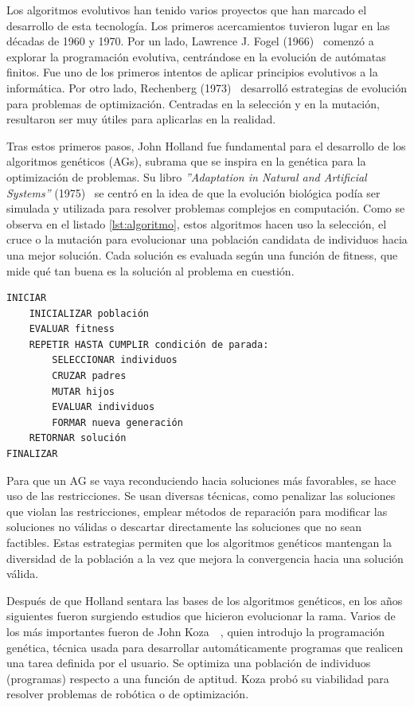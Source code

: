 Los algoritmos evolutivos han tenido varios proyectos que han marcado el desarrollo de esta tecnología. Los primeros acercamientos tuvieron lugar en las décadas de 1960 y 1970. Por un lado, Lawrence J. Fogel (1966)~\cite{fogel1966} comenzó a explorar la programación evolutiva, centrándose en la evolución de autómatas finitos. Fue uno de los primeros intentos de aplicar principios evolutivos a la informática. Por otro lado, Rechenberg (1973)~\cite{rechenberg1973} desarrolló estrategias de evolución para problemas de optimización. Centradas en la selección y en la mutación, resultaron ser muy útiles para aplicarlas en la realidad.

Tras estos primeros pasos, John Holland fue fundamental para el desarrollo de los algoritmos genéticos (AGs), subrama que se inspira en la genética para la optimización de problemas. Su libro \textit{''Adaptation in Natural and Artificial Systems''} (1975)~\cite{holland1975} se centró en la idea de que la evolución biológica podía ser simulada y utilizada para resolver problemas complejos en computación. Como se observa en el listado \ref{lst:algoritmo}, estos algoritmos hacen uso la selección, el cruce o la mutación para evolucionar una población candidata de individuos hacia una mejor solución. Cada solución es evaluada según una función de fitness, que mide qué tan buena es la solución al problema en cuestión.
\newpage
\begin{lstlisting}[caption=Algoritmo evolutivo., label={lst:algoritmo}]
INICIAR
    INICIALIZAR población
    EVALUAR fitness
    REPETIR HASTA CUMPLIR condición de parada:
        SELECCIONAR individuos
        CRUZAR padres
        MUTAR hijos
        EVALUAR individuos
        FORMAR nueva generación
    RETORNAR solución
FINALIZAR
\end{lstlisting}

Para que un AG se vaya reconduciendo hacia soluciones más favorables, se hace uso de las restricciones. Se usan diversas técnicas, como penalizar las soluciones que violan las restricciones, emplear métodos de reparación para modificar las soluciones no válidas o descartar directamente las soluciones que no sean factibles. Estas estrategias permiten que los algoritmos genéticos mantengan la diversidad de la población a la vez que mejora la convergencia hacia una solución válida.

Después de que Holland sentara las bases de los algoritmos genéticos, en los años siguientes fueron surgiendo estudios que hicieron evolucionar la rama. Varios de los más importantes fueron de John Koza~\cite{koza1992}~\cite{koza1994}, quien introdujo la programación genética, técnica usada para desarrollar automáticamente programas que realicen una tarea definida por el usuario. Se optimiza una población de individuos (programas) respecto a una función de aptitud. Koza probó su viabilidad para resolver problemas de robótica o de optimización.

